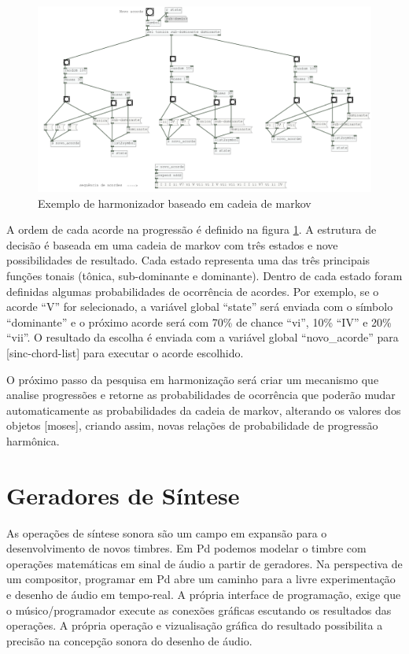 \documentclass{ppgmus}
\begin{document}
\begin{figure}
\includegraphics[scale=.5]{harm-markov}
\caption{Exemplo de harmonizador baseado em cadeia de markov}
\label{harm-markov}
\end{figure}

A ordem de cada acorde na progressão é definido na figura \ref{harm-markov}.
A estrutura de decisão é baseada em uma cadeia de markov com três estados e 
nove possibilidades de resultado. Cada estado representa uma das três principais
funções tonais (tônica, sub-dominante e dominante). Dentro de cada estado foram definidas
algumas probabilidades de ocorrência de acordes. Por exemplo, se o acorde ``V'' 
for selecionado, a variável global ``state'' será enviada com o símbolo ``dominante'' e o próximo
acorde será com 70\% de chance ``vi'', 10\% ``IV'' e 20\% ``vii''. O resultado da escolha 
é enviada com a variável global ``novo\_acorde'' para [sinc-chord-list] para executar o
acorde escolhido.

O próximo passo da pesquisa em harmonização será criar um mecanismo que analise progressões
 e retorne as probabilidades de ocorrência que poderão mudar automaticamente as probabilidades
da cadeia de markov, alterando os valores dos objetos [moses], criando assim, novas relações
de probabilidade de progressão harmônica.

\pagebreak

\section{Geradores de Síntese}

As operações de síntese sonora são um campo em expansão para o
desenvolvimento de novos timbres. Em Pd podemos modelar
o timbre com operações matemáticas em sinal de
áudio a partir de geradores.
Na perspectiva de um compositor, programar em Pd abre um caminho
 para a livre experimentação e desenho
de áudio em tempo-real. A própria interface de
programação, exige que o músico/programador execute as 
conexões gráficas escutando os resultados das operações.
 A própria operação e vizualisação gráfica 
do resultado possibilita a precisão na concepção sonora do desenho
de áudio. 
\end{document}
